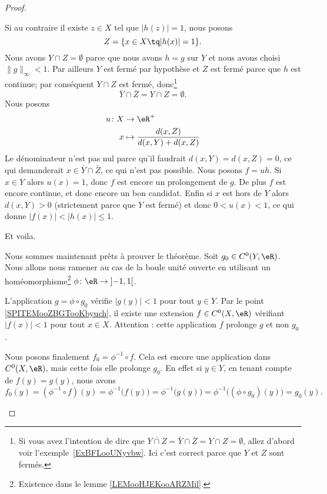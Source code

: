\begin{proof}
\begin{subproof}
		Si au contraire il existe \( z\in X\) tel que \( | h(z)|=1 \), nous posons
		\begin{equation}		\label{EQooIVXAooZQZxlq}
			Z=\{ x\in X\tq | h(x) |=1 \}.
		\end{equation}
		Nous avons \( Y\cap Z=\emptyset\) parce que nous avons \( h=g\) sur \( Y\) et nous avons choisi \( \| g \|_{\infty}<1\). Par ailleurs \( Y\) est fermé par hypothèse et \( Z\) est fermé parce que \( h\) est continue; par conséquent \( Y\cap Z\) est fermé, donc\footnote{Si vous avez l'intention de dire que \( \overline{ Y\cap Z }=\bar Y\cap\bar Z=Y\cap Z=\emptyset\), allez d'abord voir l'exemple~\ref{ExBFLooUNyvbw}. Ici c'est correct parce que \( Y\) et \( Z\) sont fermés.}
		\begin{equation}
			\bar Y\cap\bar Z=Y\cap Z=\emptyset.
		\end{equation}
		Nous posons
		\begin{equation}
			\begin{aligned}
				u\colon X & \to \eR^+                                \\
				x         & \mapsto \frac{ d(x,Z) }{ d(x,Y)+d(x,Z) }
			\end{aligned}
		\end{equation}
		Le dénominateur n'est pas nul parce qu'il faudrait \( d(x,Y)=d(x,Z)=0\), ce qui demanderait \( x\in \bar Y\cap\bar Z\), ce qui n'est pas possible. Nous posons \( f=uh\). Si \( x\in Y\) alors \( u(x)=1\), donc \( f\) est encore un prolongement de \( g\). De plus \( f\) est encore continue, et donc encore un bon candidat. Enfin si \( x\) est hors de \( Y\) alors \( d(x,Y)>0\) (strictement parce que \( Y\) est fermé) et donc \( 0<u(x)<1\), ce qui donne \( | f(x) |<| h(x) |\leq 1\).

		Et voila.


		Nous sommes maintenant prêts à prouver le théorème. Soit \( g_0\in C^0(Y,\eR)\). Nous allons nous ramener au cas de la boule unité ouverte en utilisant un homéomorphisme\footnote{Existence dans le lemme \ref{LEMooHJEKooARZMil}.} \( \phi\colon \eR\to \mathopen] -1 , 1 \mathclose[\).

		L'application \( g=\phi\circ g_0\) vérifie \( | g(y) |<1\) pour tout \( y\in Y\). Par le point \ref{SPITEMooZBGTooKbyuch}, il existe une extension \( f\in C^0(X,\eR)\) vérifiant \( | f(x) |<1\) pour tout \( x\in X\). Attention : cette application \( f\) prolonge \( g\) et non \( g_0\).

		Nous posons finalement \( f_0=\phi^{-1}\circ f\). Cela est encore une application dans \( C^0(X,\eR)\), mais cette fois elle prolonge \( g_0\). En effet si \( y\in Y\), en tenant compte de \( f(y)=g(y)\), nous avons
		\begin{equation}
			f_0(y)=(\phi^{-1}\circ f)(y)=\phi^{-1}\big( f(y) \big)=\phi^{-1}\big( g(y) \big)=\phi^{-1}\big( (\phi\circ g_0)(y) \big)=g_0(y).
		\end{equation}
	\end{subproof}
\end{proof}




